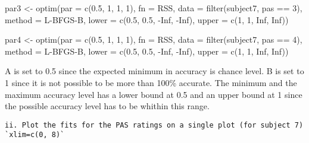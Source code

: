 \documentclass[
]{article}
\newenvironment{Shaded}{\begin{snugshade}}{\end{snugshade}}
\newcommand{\AttributeTok}[1]{\textcolor[rgb]{0.77,0.63,0.00}{#1}}
\newcommand{\ConstantTok}[1]{\textcolor[rgb]{0.00,0.00,0.00}{#1}}
\newcommand{\DecValTok}[1]{\textcolor[rgb]{0.00,0.00,0.81}{#1}}
\newcommand{\FloatTok}[1]{\textcolor[rgb]{0.00,0.00,0.81}{#1}}
\newcommand{\FunctionTok}[1]{\textcolor[rgb]{0.00,0.00,0.00}{#1}}
\newcommand{\NormalTok}[1]{#1}
\newcommand{\OtherTok}[1]{\textcolor[rgb]{0.56,0.35,0.01}{#1}}
\newcommand{\SpecialCharTok}[1]{\textcolor[rgb]{0.00,0.00,0.00}{#1}}
\newcommand{\StringTok}[1]{\textcolor[rgb]{0.31,0.60,0.02}{#1}}
\begin{document}
\begin{Shaded}
\begin{Highlighting}[]
\NormalTok{par3 }\OtherTok{\textless{}{-}} \FunctionTok{optim}\NormalTok{(}\AttributeTok{par =} \FunctionTok{c}\NormalTok{(}\FloatTok{0.5}\NormalTok{, }\DecValTok{1}\NormalTok{, }\DecValTok{1}\NormalTok{, }\DecValTok{1}\NormalTok{),}
      \AttributeTok{fn =}\NormalTok{ RSS, }
      \AttributeTok{data =} \FunctionTok{filter}\NormalTok{(subject7, pas }\SpecialCharTok{==} \StringTok{\textquotesingle{}3\textquotesingle{}}\NormalTok{), }
      \AttributeTok{method =} \StringTok{\textquotesingle{}L{-}BFGS{-}B\textquotesingle{}}\NormalTok{, }
      \AttributeTok{lower =} \FunctionTok{c}\NormalTok{(}\FloatTok{0.5}\NormalTok{, }\FloatTok{0.5}\NormalTok{, }\SpecialCharTok{{-}}\ConstantTok{Inf}\NormalTok{, }\SpecialCharTok{{-}}\ConstantTok{Inf}\NormalTok{), }
      \AttributeTok{upper =} \FunctionTok{c}\NormalTok{(}\DecValTok{1}\NormalTok{, }\DecValTok{1}\NormalTok{, }\ConstantTok{Inf}\NormalTok{, }\ConstantTok{Inf}\NormalTok{))}

\NormalTok{par4 }\OtherTok{\textless{}{-}} \FunctionTok{optim}\NormalTok{(}\AttributeTok{par =} \FunctionTok{c}\NormalTok{(}\FloatTok{0.5}\NormalTok{, }\DecValTok{1}\NormalTok{, }\DecValTok{1}\NormalTok{, }\DecValTok{1}\NormalTok{),}
      \AttributeTok{fn =}\NormalTok{ RSS, }
      \AttributeTok{data =} \FunctionTok{filter}\NormalTok{(subject7, pas }\SpecialCharTok{==} \StringTok{\textquotesingle{}4\textquotesingle{}}\NormalTok{), }
      \AttributeTok{method =} \StringTok{\textquotesingle{}L{-}BFGS{-}B\textquotesingle{}}\NormalTok{, }
      \AttributeTok{lower =} \FunctionTok{c}\NormalTok{(}\FloatTok{0.5}\NormalTok{, }\FloatTok{0.5}\NormalTok{, }\SpecialCharTok{{-}}\ConstantTok{Inf}\NormalTok{, }\SpecialCharTok{{-}}\ConstantTok{Inf}\NormalTok{), }
      \AttributeTok{upper =} \FunctionTok{c}\NormalTok{(}\DecValTok{1}\NormalTok{, }\DecValTok{1}\NormalTok{, }\ConstantTok{Inf}\NormalTok{, }\ConstantTok{Inf}\NormalTok{))}
\end{Highlighting}
\end{Shaded}

A is set to 0.5 since the expected minimum in accuracy is chance level.
B is set to 1 since it is not possible to be more than 100\% accurate.
The minimum and the maximum accuracy level has a lower bound at 0.5 and
an upper bound at 1 since the possible accuracy level has to be whithin
this range.

\begin{verbatim}
ii. Plot the fits for the PAS ratings on a single plot (for subject 7) `xlim=c(0, 8)`
\end{verbatim}
\end{document}
